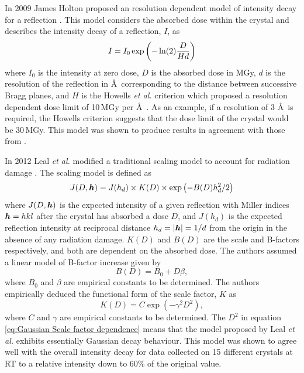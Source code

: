         In 2009 James Holton proposed an resolution dependent model of intensity decay for a reflection \cite{holton2009}. This model considers the absorbed dose within the crystal and describes the intensity decay of a reflection, $I$, as
        \begin{equation}
            I = I_0 \exp \left(-\ln(2)\frac{D}{Hd}\right)
        \end{equation}
        where $I_0$ is the intensity at zero dose, $D$ is the absorbed dose in MGy, $d$ is the resolution of the reflection in \AA\ corresponding to the distance between successive Bragg planes, and $H$ is the Howells \textit{et al.} criterion which proposed a resolution dependent dose limit of 10\,MGy per \AA\ \cite{howells2009}.
        As an example, if a resolution of 3 \AA\ is required, the Howells criterion suggests that the dose limit of the crystal would be 30\,MGy.
		This model was shown to produce results in agreement with those from \cite{owen2006,kmetko2006}.

        In 2012 Leal \textit{et al.} modified a traditional scaling model to account for radiation damage \cite{leal2012}. The scaling model is defined as
        \begin{equation}
            J(D,\boldsymbol{h}) = J(h_d) \times K(D) \times \exp\left( -B(D) h_d^2/2\right)
			\label{eq:Scaling Model Leal 2012}
        \end{equation}
        where $J(D,\boldsymbol{h})$ is the expected intensity of a given reflection with Miller indices $\boldsymbol{h} = hkl$ after the crystal has absorbed a dose $D$, and $J(h_d)$ is the expected reflection intensity at reciprocal distance $h_d = |\boldsymbol{h}| = 1/d$ from the origin in the absence of any radiation damage.
		$K(D)$ and $B(D)$ are the scale and B-factors respectively, and both are dependent on the absorbed dose.
		The authors assumed a linear model of B-factor increase given by
		\begin{equation}
			B(D) = B_0 + D \beta,
            \label{eq:Linear B factor dependence}
		\end{equation}
		where $B_0$ and $\beta$ are empirical constants to be determined.
		The authors empirically deduced the functional form of the scale factor, $K$ as
		\begin{equation}
			K(D) = C \exp\left(-\gamma^2 D^2\right),
            \label{eq:Gaussian Scale factor dependence}
		\end{equation}
		where $C$ and $\gamma$ are empirical constants to be determined.
        The $D^2$ in equation \ref{eq:Gaussian Scale factor dependence} means that the model proposed by Leal \textit{et al.} exhibits essentially Gaussian decay behaviour.
		This model was shown to agree well with the overall intensity decay for data collected on 15 different crystals at RT to a relative intensity down to 60\% of the original value.

